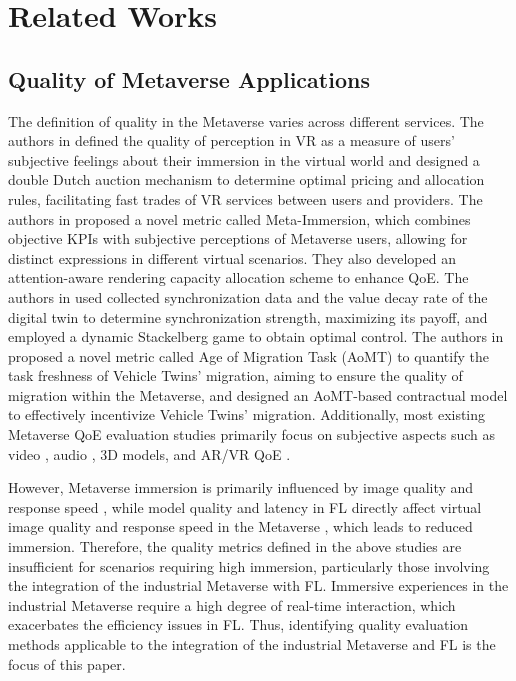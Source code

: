 \section{Related Works}
\subsection{Quality of Metaverse Applications}
The definition of quality in the Metaverse varies across different services. The authors in \cite{b16} defined the quality of perception in VR as a measure of users' subjective feelings about their immersion in the virtual world and designed a double Dutch auction mechanism to determine optimal pricing and allocation rules, facilitating fast trades of VR services between users and providers. The authors in \cite{b17} proposed a novel metric called Meta-Immersion, which combines objective KPIs with subjective perceptions of Metaverse users, allowing for distinct expressions in different virtual scenarios. They also developed an attention-aware rendering capacity allocation scheme to enhance QoE. The authors in \cite{b18} used collected synchronization data and the value decay rate of the digital twin to determine synchronization strength, maximizing its payoff, and employed a dynamic Stackelberg game to obtain optimal control. The authors in \cite{b19} proposed a novel metric called Age of Migration Task (AoMT) to quantify the task freshness of Vehicle Twins' migration, aiming to ensure the quality of migration within the Metaverse, and designed an AoMT-based contractual model to effectively incentivize Vehicle Twins' migration. Additionally, most existing Metaverse QoE evaluation studies primarily focus on subjective aspects such as video \cite{b12}, audio \cite{b13}, 3D models, and AR/VR QoE \cite{b14}.

However, Metaverse immersion is primarily influenced by image quality and response speed \cite{b41,b42}, while model quality and latency in FL directly affect virtual image quality and response speed in the Metaverse \cite{b43}, which leads to reduced immersion. Therefore, the quality metrics defined in the above studies are insufficient for scenarios requiring high immersion, particularly those involving the integration of the industrial Metaverse with FL. Immersive experiences in the industrial Metaverse require a high degree of real-time interaction, which exacerbates the efficiency issues in FL. Thus, identifying quality evaluation methods applicable to the integration of the industrial Metaverse and FL is the focus of this paper.

